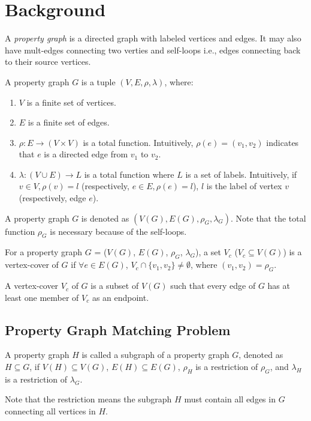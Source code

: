 \section{Background}\label{sec:background}
A \emph{property graph} is a directed graph with labeled vertices and edges. It may also have mult-edges connecting two verties and self-loops i.e., edges connecting back to their source vertices.

\begin{definition}
  A property graph $G$ is a tuple $(V, E, \rho, \lambda)$, where:
  \begin{enumerate}[noitemsep,label={(\arabic*)}]
  \item $V$ is a finite set of vertices.
  \item $E$ is a finite set of edges.
  \item $\rho: E \rightarrow (V \times V)$ is a total function.
    Intuitively, $\rho(e) = (v_1, v_2)$ indicates that $e$ is a directed edge from $v_1$ to $v_2$.
  \item $\lambda :(V \cup E) \rightarrow L$ is a total function where $L$ is a set of labels.
    Intuitively, if $v \in V, \rho(v) = l$ (respectively, $e \in E, \rho(e) = l$),
    $l$ is the label of vertex $v$ (respectively, edge $e$).
  \end{enumerate}
\end{definition}
A property graph $G$ is denoted as $(V(G), E(G), \rho_G, \lambda_G)$.
Note that the total function $\rho_G$ is necessary because of the self-loops.

\begin{definition}
  For a property graph $G$ = ($V(G)$, $E(G)$, $\rho_G$, $\lambda_G$), a set $V_c$ ($V_c \subseteq V(G)$) is a vertex-cover of $G$
  if $\forall e \in E(G)$, $V_c \cap \{ v_1, v_2 \} \ne \emptyset$, where $(v_1, v_2) = \rho_G$.
\end{definition}
A vertex-cover $V_c$ of $G$ is a subset of $V(G)$ such that every edge of $G$ has at least one member of $V_c$ as an endpoint.
\subsection{Property Graph Matching Problem}
\begin{definition}[Subgraph]
  A property graph $H$ is called a subgraph of a property graph $G$, denoted as $H \subseteq G$, if
  $V(H) \subseteq V(G)$, $E(H) \subseteq E(G)$, $\rho_H$ is a restriction of $\rho_G$, and $\lambda_H$ is a restriction of $\lambda_G$.
\end{definition}
Note that the restriction means the subgraph $H$ must contain all edges in $G$ connecting all vertices in $H$.


